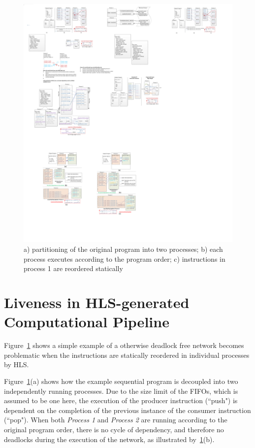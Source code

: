 \begin{figure}[htp]
\begin{center}
\includegraphics[width=0.8\linewidth]{chap4fig/cycleInstances2.pdf}
\caption{a) partitioning of the original program into two processes; b) each process executes according to the program order; c) instructions in process 1 are reordered statically
\label{fig:deadlockfig}}
\end{center}
\end{figure}

\section{Liveness in HLS-generated Computational Pipeline }
Figure~\ref{fig:deadlockfig} shows a simple example of a otherwise deadlock free network becomes problematic
when the instructions are statically reordered in individual processes by HLS. 

Figure~\ref{fig:deadlockfig}(a) shows how the example sequential program is decoupled into two independently running processes. Due to the size limit of the FIFOs, which is assumed to be one here, the execution
of the producer instruction (``push") is dependent on the completion of the previous instance
of the consumer instruction (``pop"). 
When both \textit{Process 1} and \textit{Process 2} are running according to the original program order,  there is no cycle of dependency, and therefore no deadlocks during the execution of the network, as illustrated by~\ref{fig:deadlockfig}(b).

